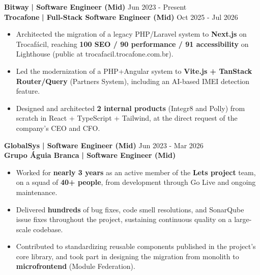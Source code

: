 \documentclass[a4paper]{article}
\begin{document}
    \textbf{Bitway}\textbf{ | Software Engineer (Mid)} \hfill  Jun 2023 - Present\\
    \textbf{Trocafone}\textbf{ | Full-Stack Software Engineer (Mid)}  \hfill  Oct 2025 - Jul 2026\\
    \vspace{-3mm}
    \begin{itemize} \itemsep -3pt
        \item Architected the migration of a legacy PHP/Laravel system to \textbf{Next.js} on Trocaf\'acil, reaching \textbf{100 SEO / 90 performance / 91 accessibility} on Lighthouse (public at trocafacil.trocafone.com.br).
    \end{itemize}
    \vspace{-3mm}
    \begin{itemize} \itemsep -3pt
        \item Led the modernization of a PHP+Angular system to \textbf{Vite.js + TanStack Router/Query} (Partners System), including an AI-based IMEI detection feature.
        \item Designed and architected \textbf{2 internal products} (Integr8 and Polly) from scratch in React + TypeScript + Tailwind, at the direct request of the company's CEO and CFO.
    \end{itemize}

    \textbf{GlobalSys}\textbf{ | Software Engineer (Mid)} \hfill  Jun 2023 - Mar 2026\\
    \textbf{Grupo \'Aguia Branca}\textbf{ | Software Engineer (Mid)}\\
    \vspace{-3mm}
    \begin{itemize} \itemsep -3pt
        \item Worked for \textbf{nearly 3 years} as an active member of the \textbf{Lets project} team, on a squad of \textbf{40+ people}, from development through Go Live and ongoing maintenance.
        \item Delivered \textbf{hundreds} of bug fixes, code smell resolutions, and SonarQube issue fixes throughout the project, sustaining continuous quality on a large-scale codebase.
        \item Contributed to standardizing reusable components published in the project's core library, and took part in designing the migration from monolith to \textbf{microfrontend} (Module Federation).
    \end{itemize}
\end{document}
